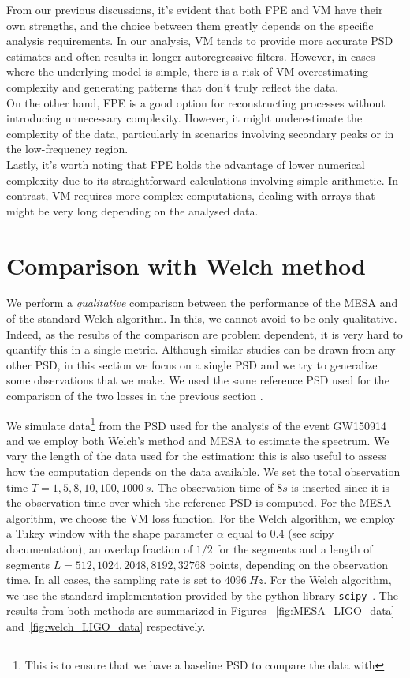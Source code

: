 \documentclass[epj,nopacs]{svjour}
\begin{document}
From our previous discussions, it's evident that both FPE and VM have their own strengths, and the choice between them greatly depends on the specific analysis requirements. In our analysis, VM tends to provide more accurate PSD estimates and often results in longer autoregressive filters. However, in cases where the underlying model is simple, there is a risk of VM overestimating complexity and generating patterns that don't truly reflect the data.\\ 
On the other hand, FPE is a good option for reconstructing processes without introducing unnecessary complexity. However, it might underestimate the complexity of the data, particularly in scenarios involving secondary peaks or in the low-frequency region.\\ 

Lastly, it's worth noting that FPE holds the advantage of lower numerical complexity due to its straightforward calculations involving simple arithmetic. In contrast, VM requires more complex computations, dealing with arrays that might be very long depending on the analysed data.

\section{Comparison with Welch method}\label{sec:Welch_comparison}

We perform a {\it qualitative} comparison between the performance of the MESA and of the standard Welch algorithm.
In this, we cannot avoid to be only qualitative. Indeed, as the results of the comparison are problem dependent, it is very hard to quantify this in a single metric. Although similar studies can be drawn from any other PSD, in this section we focus on a single PSD and we try to generalize some observations that we make.
We used the same reference PSD used for the comparison of the two losses in the previous section \cite{Cornish_2015,Littenberg_2015,Cornish_2020,Chatziioannou_2019}.

We simulate data\footnote{This is to ensure that we have a baseline PSD to compare the data with} from the PSD used for the analysis of the event GW150914 and we employ both Welch's method and MESA to estimate the spectrum.
We vary the length of the data used for the estimation: this is also useful to assess how the computation depends on the data available. We set the total observation time $T = 1, 5, 8, 10, 100, 1000 \SI{}{s}$. The observation time of $8s$ is inserted since it is the observation time over which the reference PSD is computed. 
For the MESA algorithm, we choose the VM loss function. For the Welch algorithm, we employ a Tukey window with the shape parameter $\alpha$ 
equal to 0.4 (see scipy documentation), an overlap fraction of $1/2$ for the segments and a length of 
segments $L = 512, 1024, 2048, 8192, 32768$ points, depending on the observation time.
In all cases, the sampling rate is set to $\SI{4096}{Hz}$.
For the Welch algorithm, we use the standard implementation provided by the python library \texttt{scipy}~\cite{numpy,scipy}.
The results from both methods are summarized in  Figures ~\ref{fig:MESA_LIGO_data} and~\ref{fig:welch_LIGO_data} respectively.
\end{document}
